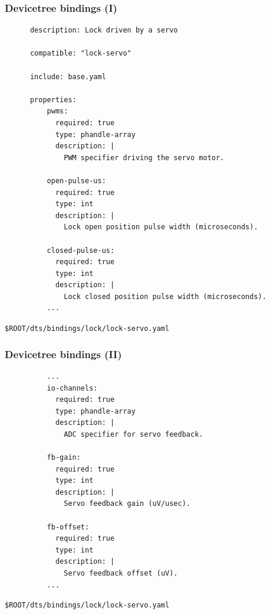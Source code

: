 \documentclass[handout]{beamer}
\begin{document}
\begin{frame}[fragile]
  \frametitle{Devicetree bindings (I)}

  \begin{listing}[H]
    \begin{verbatim}
      description: Lock driven by a servo

      compatible: "lock-servo"

      include: base.yaml

      properties:
          pwms:
            required: true
            type: phandle-array
            description: |
              PWM specifier driving the servo motor.

          open-pulse-us:
            required: true
            type: int
            description: |
              Lock open position pulse width (microseconds).

          closed-pulse-us:
            required: true
            type: int
            description: |
              Lock closed position pulse width (microseconds).
          ...
    \end{verbatim}
    \caption{\texttt{\$ROOT/dts/bindings/lock/lock-servo.yaml}}
  \end{listing}
\end{frame}

\begin{frame}[fragile]
  \frametitle{Devicetree bindings (II)}

  \begin{listing}[H]
    \begin{verbatim}
          ...
          io-channels:
            required: true
            type: phandle-array
            description: |
              ADC specifier for servo feedback.

          fb-gain:
            required: true
            type: int
            description: |
              Servo feedback gain (uV/usec).

          fb-offset:
            required: true
            type: int
            description: |
              Servo feedback offset (uV).
          ...
    \end{verbatim}
    \caption{\texttt{\$ROOT/dts/bindings/lock/lock-servo.yaml}}
  \end{listing}
\end{frame}
\end{document}
